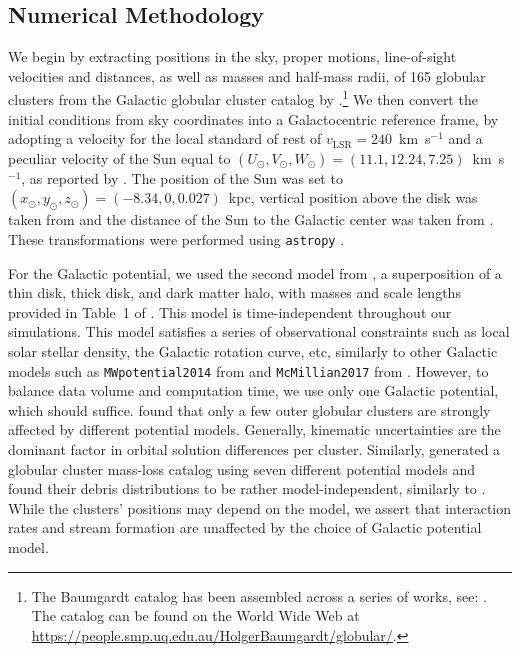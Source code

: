 \documentclass[draft]{aa}
\begin{document}
  \subsection{Numerical Methodology}
    We begin by extracting positions in the sky, proper motions, line-of-sight velocities and distances, as well as masses and half-mass radii, of 165 globular clusters from the Galactic globular cluster catalog by \cite{2021MNRAS.505.5957B}.\footnote{The Baumgardt catalog has been assembled across a series of works, see: \cite{2020PASA...37...46B,2019MNRAS.482.5138B,2018MNRAS.478.1520B}. The catalog can be found on the World Wide Web at \href{https://people.smp.uq.edu.au/HolgerBaumgardt/globular/}{https://people.smp.uq.edu.au/HolgerBaumgardt/globular/}.} We then convert the initial conditions from sky coordinates into a Galactocentric reference frame, by adopting a velocity for the local standard of rest of $v_{\text{LSR}} = 240$~km~s$^{-1}$ and a peculiar velocity of the Sun equal to $(U_\odot, V_\odot, W_\odot)=(11.1, 12.24, 7.25)$~km~s$^{-1}$, as reported by \citet{2012MNRAS.427..274S}.  The position of the Sun was set to $(x_\odot,y_\odot,z_\odot) = (-8.34,0,0.027)$~kpc, vertical position above the disk was taken from \citet{2001ApJ...553..184C} and the distance of the Sun to the Galactic center was taken from \citet{2014ApJ...783..130R}. These transformations were performed using \texttt{astropy} \citep{2013A&A...558A..33A}.

    For the Galactic potential, we used the second model from \citet{2017A&A...598A..66P}, a superposition of a thin disk, thick disk, and dark matter halo, with masses and scale lengths provided in Table~1 of \citet{2023A&A...673A..44F}. This model is time-independent throughout our simulations. This model satisfies a series of observational constraints such as local solar stellar density, the Galactic rotation curve, etc, similarly to other Galactic models such as \texttt{MWpotential2014} from \citet{2015ApJS..216...29B} and \texttt{McMillian2017} from \citet{2017MNRAS.465...76M}. However, to balance data volume and computation time, we use only one Galactic potential, which should suffice. \citet{2021MNRAS.505.5978V} found that only a few outer globular clusters are strongly affected by different potential models. Generally, kinematic uncertainties are the dominant factor in orbital solution differences per cluster. Similarly, \citet{2024MNRAS.528.5189G} generated a globular cluster mass-loss catalog using seven different potential models and found their debris distributions to be rather model-independent, similarly to \citet{2023A&A...673A..44F}. While the clusters' positions may depend on the model, we assert that interaction rates and stream formation are unaffected by the choice of Galactic potential model.  
    
\end{document}
